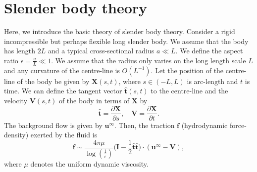 \documentclass[12pt,MSc,twoside]{muthesis_2020}
\begin{document}
\section{Slender body theory}
Here, we introduce the basic theory of slender body theory. Consider a rigid incompressible but perhaps flexible long slender body. We assume that the body has length $2L$ and a typical cross-sectional radius $a\ll L$. We define the aspect ratio $\epsilon=\frac{a}{L}\ll 1$. We assume that the radius only varies on the long length scale $L$ and any curvature of the centre-line is $O(L^{-1})$. Let the position of the centre-line of the body be given by $\mathbf{X}(s,t)$, where $s \in (-L,L)$ is arc-length and $t$ is time. We can define the tangent vector $\hat{\mathbf{t}}(s,t)$ to the centre-line and the velocity $\mathbf{V}(s,t)$ of the body in terms of $\mathbf{X}$ by
\begin{equation}
\label{eqn:105}
\hat{\mathbf{t}}=\frac{\partial \mathbf{X}}{\partial s}, \quad \mathbf{V}=\frac{\partial\mathbf{X}}{\partial t}.
\end{equation}
The background flow is given by $\mathbf{u}^\infty$. Then, the traction $\mathbf{f}$ (hydrodynamic force-density) exerted by the fluid is 
\begin{equation}
\label{eqn:106}
\mathbf{f}\sim \frac{4\pi\mu}{\log(\frac{1}{\epsilon})}\Bigg(\mathbf{I}-\frac{1}{2} \hat{\mathbf{t}}\hat{\mathbf{t}}\Bigg)\cdot(\mathbf{u}^\infty-\mathbf{V}),
\end{equation}
where $\mu$ denotes the uniform dynamic viscosity.
\end{document}
